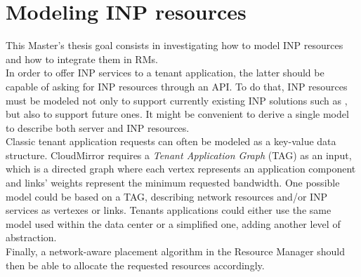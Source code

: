 \documentclass[letterpaper,twocolumn,10pt]{article}
\begin{document}
\section{Modeling INP resources}
This Master's thesis goal consists in investigating how to model INP resources and how to integrate them in RMs.\\
In order to offer INP services to a tenant application, the latter should be capable of asking for INP resources through an API. To do that, INP resources must be modeled not only to support currently existing INP solutions such as \cite{daiet} \cite{netchain} \cite{incbricks} \cite{sharp}, but also to support future ones. It might be convenient to derive a single model to describe both server and INP resources.\\
Classic tenant application requests can often be modeled as a key-value data structure. CloudMirror \cite{cloudmirror} requires a \textit{Tenant Application Graph} (TAG) as an input, which is a directed graph where each vertex represents an application component and links' weights represent the minimum requested bandwidth. One possible model could be based on a TAG, describing network resources and/or INP services as vertexes or links. Tenants applications could either use the same model used within the data center or a simplified one, adding another level of abstraction.\\
Finally, a network-aware placement algorithm in the Resource Manager should then be able to allocate the requested resources accordingly.



\end{document}
